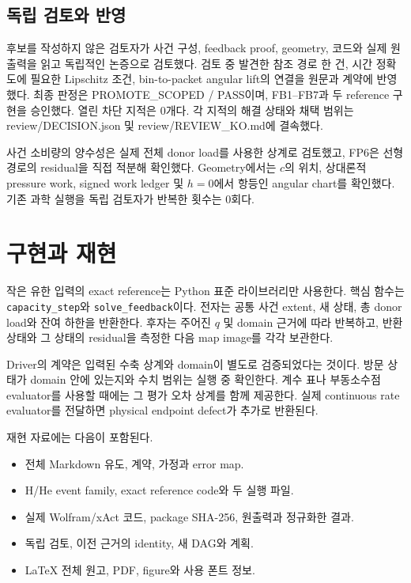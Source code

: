 \hypertarget{uxb3c5uxb9bd-uxac80uxd1a0uxc640-uxbc18uxc601}{%
\subsection{독립 검토와 반영}\label{uxb3c5uxb9bd-uxac80uxd1a0uxc640-uxbc18uxc601}}

후보를 작성하지 않은 검토자가 사건 구성, feedback proof, geometry, 코드와 실제 원출력을 읽고 독립적인 논증으로 검토했다. 검토 중 발견한 참조 경로 한 건, 시간 정확도에 필요한 Lipschitz 조건, bin-to-packet angular lift의 연결을 원문과 계약에 반영했다. 최종 판정은 PROMOTE\_SCOPED / PASS이며, FB1--FB7과 두 reference 구현을 승인했다. 열린 차단 지적은 0개다. 각 지적의 해결 상태와 채택 범위는 review/DECISION.json 및 review/REVIEW\_KO.md에 결속했다.

사건 소비량의 양수성은 실제 전체 donor load를 사용한 상계로 검토했고, FP6은 선형 경로의 residual을 직접 적분해 확인했다. Geometry에서는 \(c\)의 위치, 상대론적 pressure work, signed work ledger 및 \(h=0\)에서 항등인 angular chart를 확인했다. 기존 과학 실행을 독립 검토자가 반복한 횟수는 0회다.

\hypertarget{uxad6cuxd604uxacfc-uxc7acuxd604}{%
\section{구현과 재현}\label{uxad6cuxd604uxacfc-uxc7acuxd604}}

작은 유한 입력의 exact reference는 Python 표준 라이브러리만 사용한다. 핵심 함수는 \texttt{capacity\_step}와 \texttt{solve\_feedback}이다. 전자는 공통 사건 extent, 새 상태, 총 donor load와 잔여 하한을 반환한다. 후자는 주어진 \(q\) 및 domain 근거에 따라 반복하고, 반환 상태와 그 상태의 residual을 측정한 다음 map image를 각각 보관한다.

Driver의 계약은 입력된 수축 상계와 domain이 별도로 검증되었다는 것이다. 방문 상태가 domain 안에 있는지와 수치 범위는 실행 중 확인한다. 계수 표나 부동소수점 evaluator를 사용할 때에는 그 평가 오차 상계를 함께 제공한다. 실제 continuous rate evaluator를 전달하면 physical endpoint defect가 추가로 반환된다.

재현 자료에는 다음이 포함된다.

\begin{itemize}
\tightlist
\item
  전체 Markdown 유도, 계약, 가정과 error map.
\item
  H/He event family, exact reference code와 두 실행 파일.
\item
  실제 Wolfram/xAct 코드, package SHA-256, 원출력과 정규화한 결과.
\item
  독립 검토, 이전 근거의 identity, 새 DAG와 계획.
\item
  LaTeX 전체 원고, PDF, figure와 사용 폰트 정보.
\end{itemize}

